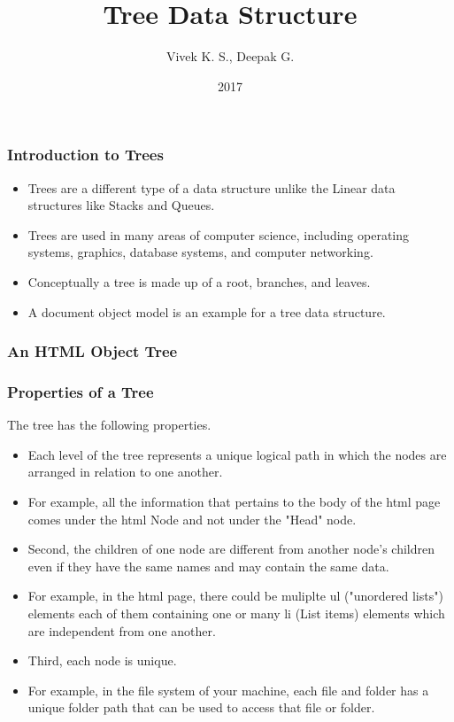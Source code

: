 \documentclass{beamer}
\title{Tree Data Structure}
\author{Vivek K. S., Deepak G.}
\institute{Information Systems Decision Sciences (ISDS)\\
MUMA College of Business\\
University of South Florida \\
Tampa, Florida}
\date{2017}
\begin{document}
 
\frame{\titlepage}
 
\begin{frame}
\frametitle{Introduction to Trees}
\begin{itemize}


\item Trees are a different type of a data structure unlike the Linear data structures like Stacks and Queues.

\item Trees are used in many areas of computer science, including operating systems, graphics, database systems, and computer networking.

\item Conceptually a tree is made up of a root, branches, and leaves.

\item A document object model is an example for a tree data structure.
\end{itemize}

\end{frame}

\begin{frame}
\frametitle{An HTML Object Tree}
\end{frame}

\begin{frame}
\frametitle{Properties of a Tree}
The tree has the following properties.
\begin{itemize}
\item Each level of the tree represents a unique logical path in which the nodes are arranged in relation to one another.

\item For example, all the  information that pertains to the body of the html page comes under the html Node and not under the "Head" node.

\item Second, the children of one node are different from another node's children even if they have the same names and may contain the same data.

\item For example, in the html page, there could be muliplte ul ("unordered lists") elements each of them containing one or many li (List items) elements which are independent from one another.

\item Third, each node is unique.

\item For example, in the file system of your machine, each file and folder has a unique folder path that can be used to access that file or folder.
\end{itemize}
\end{frame}
\end{document}
